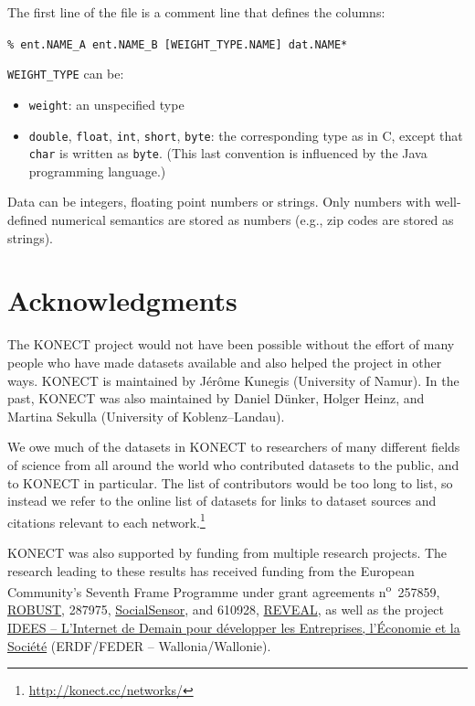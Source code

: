 \documentclass{article}
\begin{document}
The first line of the file is a comment line that defines the columns: 

\texttt{\% ent.NAME\_A ent.NAME\_B [WEIGHT\_TYPE.NAME] dat.NAME*}

\texttt{WEIGHT\_TYPE} can be:
\begin{itemize}
  \item \texttt{weight}: an unspecified type
  \item \texttt{double}, \texttt{float}, \texttt{int}, \texttt{short}, \texttt{byte}: the corresponding type as in
    C, except that \texttt{char} is written as \texttt{byte}.  (This
    last convention is influenced by the Java programming language.)
\end{itemize}

Data can be integers, floating point numbers or strings.  Only numbers
with well-defined numerical semantics are stored as numbers (e.g., zip codes are
stored as strings). 

\section*{Acknowledgments}
The KONECT project would not have been possible without the
effort of many people who have made datasets available and also helped
the project in other ways.   
KONECT is maintained by Jérôme Kunegis (University of Namur). 
In the past, KONECT was also maintained by Daniel Dünker, Holger Heinz,
and Martina Sekulla (University of Koblenz--Landau). 

We owe much of the datasets in KONECT to researchers of many different
fields of science from all around the world who contributed datasets to
the public, and to KONECT in particular.  The list of contributors would
be too long to list, so instead we refer to the online list of datasets
for links to dataset sources and citations relevant to each
network.\footnote{\url{http://konect.cc/networks/}}

KONECT was also supported by funding from multiple research projects. 
The research leading to
these results has received funding from the European Community's Seventh
Frame Programme under grant agreements n\textsuperscript{o}~257859,
\href{http://robust-project.eu/}{ROBUST}, 287975,
\href{http://www.socialsensor.eu/}{SocialSensor}, and 610928,
\href{http://revealproject.eu/}{REVEAL}, as well as the project
\href{http://nouvelles.unamur.be/upnews.2015-10-01.8995593781}{IDEES --
  L'Internet de Demain pour développer les Entreprises, l'Économie et la
  Société} (ERDF/FEDER -- Wallonia/Wallonie). 
\end{document}
